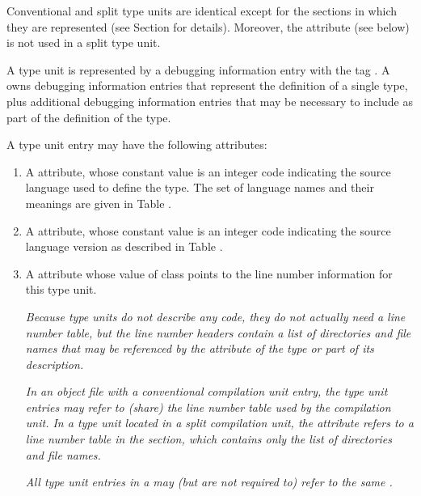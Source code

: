 Conventional and split type units are identical except for
the sections in which they are represented
(see Section  for details).
Moreover, the
\bb
\DWATstroffsets{}
\eb
attribute (see below) is not
used in a split type unit.

A type unit is represented by a debugging information entry
with the tag \DWTAGtypeunitTARG.
A  owns debugging
information entries that represent the definition of a single
type, plus additional debugging information entries that may
be necessary to include as part of the definition of the type.

A type unit entry may have the following attributes:
\begin{enumerate}[1. ]

\item A
\bb
\DWATlanguagename{} attribute,
whose
\eb
{}
constant value is an integer code indicating the source
language used to define the type. The set of language names
and their meanings are given in Table .

\bb
\item A \DWATlanguageversion{} attribute, whose constant value is an
integer code indicating the source language version as described in
Table .
\eb

\item A \DWATstmtlist{} attribute
whose value of class \CLASSlineptr{} points to the line number
information for this type unit.

\textit{Because type units do not describe any code, they
do not actually need a line number table, but the line number
headers contain a list of directories and file names that
may be referenced by the \DWATdeclfile{} attribute of the
type or part of its description.}

\textit{In an object file with a conventional compilation
unit entry, the type unit entries may refer to (share) the
line number table used by the compilation unit. In a type
unit located in a split compilation unit, the
\DWATstmtlistNAME{} attribute refers to a 
line number table in the \dotdebuglinedwo{} section, which
contains only the list of directories and file names.}

\textit{All type unit entries in a \splitDWARFobjectfile{} may
(but are not required to) refer to the same
.}


\end{enumerate}
